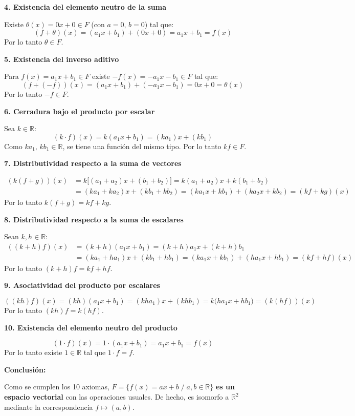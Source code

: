 \documentclass[12pt]{article}
\begin{document}
\begin{enumerate}[label=\alph*.-]
    \textbf{4. Existencia del elemento neutro de la suma}

    Existe $\theta(x)=0x+0 \in F$ (con $a=0,\,b=0$) tal que:
    \[
    (f+\theta)(x) = (a_1x+b_1)+(0x+0) = a_1x+b_1 = f(x)
    \]
    Por lo tanto $\theta \in F$.

    \textbf{5. Existencia del inverso aditivo}

    Para $f(x)=a_1x+b_1 \in F$ existe $-f(x)=-a_1x-b_1 \in F$ tal que:
    \[
    (f+(-f))(x) = (a_1x+b_1)+(-a_1x-b_1) = 0x+0 = \theta(x)
    \]
    Por lo tanto $-f \in F$.

    \textbf{6. Cerradura bajo el producto por escalar}

    Sea $k \in \mathbb{R}$:
    \[
    (k\cdot f)(x) = k(a_1x+b_1) = (ka_1)x+(kb_1)
    \]
    Como $ka_1,\, kb_1 \in \mathbb{R}$, se tiene una función del mismo tipo. Por lo tanto $kf \in F$.

    \textbf{7. Distributividad respecto a la suma de vectores}

    \begin{align*}
    (k(f+g))(x) &= k\big[(a_1+a_2)x+(b_1+b_2)\big] = k(a_1+a_2)x+k(b_1+b_2)\\
    &= (ka_1+ka_2)x+(kb_1+kb_2) = (ka_1x+kb_1)+(ka_2x+kb_2) = (kf+kg)(x)
    \end{align*}
    Por lo tanto $k(f+g)=kf+kg$.

    \textbf{8. Distributividad respecto a la suma de escalares}

    Sean $k,h \in \mathbb{R}$:
    \begin{align*}
    ((k+h)f)(x) &= (k+h)(a_1x+b_1) = (k+h)a_1x+(k+h)b_1\\
    &= (ka_1+ha_1)x+(kb_1+hb_1) = (ka_1x+kb_1)+(ha_1x+hb_1) = (kf+hf)(x)
    \end{align*}
    Por lo tanto $(k+h)f=kf+hf$.

    \textbf{9. Asociatividad del producto por escalares}

    \[
    ((kh)f)(x) = (kh)(a_1x+b_1) = (kha_1)x+(khb_1) = k\big(ha_1x+hb_1\big) = (k(hf))(x)
    \]
    Por lo tanto $(kh)f=k(hf)$.

    \textbf{10. Existencia del elemento neutro del producto}

    \[
    (1\cdot f)(x) = 1\cdot(a_1x+b_1) = a_1x+b_1 = f(x)
    \]
    Por lo tanto existe $1\in\mathbb{R}$ tal que $1\cdot f=f$.

    \textbf{Conclusión:}

    Como se cumplen los 10 axiomas, $F=\{f(x)=ax+b \; / \; a,b\in\mathbb{R}\}$ \textbf{es un espacio vectorial} con las operaciones usuales. De hecho, es isomorfo a $\mathbb{R}^2$ mediante la correspondencia $f\mapsto(a,b)$.
\end{enumerate}
\end{document}
